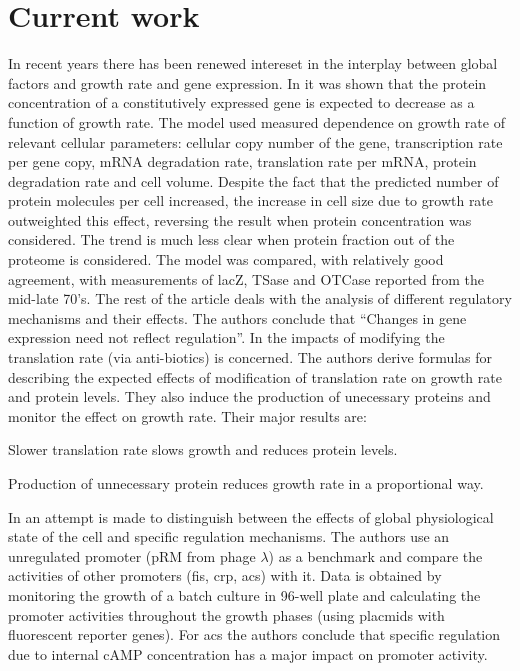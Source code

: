 \documentclass{report}
\begin{document}
\section{Current work}
In recent years there has been renewed intereset in the interplay between global factors and growth rate and gene expression.
In \cite{Klumpp2009a} it was shown that the protein concentration of a constitutively expressed gene is expected to decrease as a function of growth rate.
The model used measured dependence on growth rate of relevant cellular parameters: cellular copy number of the gene, transcription rate per gene copy, mRNA degradation rate, translation rate per mRNA, protein degradation rate and cell volume.
Despite the fact that the predicted number of protein molecules per cell increased, the increase in cell size due to growth rate outweighted this effect, reversing the result when protein concentration was considered.
The trend is much less clear when protein fraction out of the proteome is considered.
The model was compared, with relatively good agreement, with measurements of lacZ, TSase and OTCase reported from the mid-late 70's.
The rest of the article deals with the analysis of different regulatory mechanisms and their effects.
The authors conclude that ``Changes in gene expression need not reflect regulation''.
In \cite{Scott2010a} the impacts of modifying the translation rate (via anti-biotics) is concerned.
The authors derive formulas for describing the expected effects of modification of translation rate on growth rate and protein levels.
They also induce the production of unecessary proteins and monitor the effect on growth rate.
Their major results are:
\begin{enumeration}
\item Slower translation rate slows growth and reduces protein levels.
\item Production of unnecessary protein reduces growth rate in a proportional way.
\end{enumeration}
In \cite{Berthoumieux2013} an attempt is made to distinguish between the effects of global physiological state of the cell and specific regulation mechanisms.
The authors use an unregulated promoter (pRM from phage $\lambda$) as a benchmark and compare the activities of other promoters (fis, crp, acs) with it.
Data is obtained by monitoring the growth of a batch culture in 96-well plate and calculating the promoter activities throughout the growth phases (using placmids with fluorescent reporter genes).
For acs the authors conclude that specific regulation due to internal cAMP concentration has a major impact on promoter activity.
\end{document}
